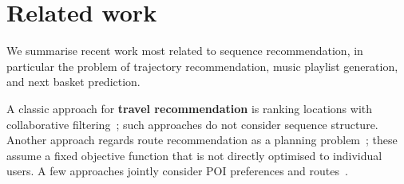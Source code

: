 




\section{Related work}
\label{sec:related}


We summarise recent work most related to sequence recommendation, 
in particular the problem of trajectory recommendation, music playlist generation, 
and next basket prediction.


A classic approach for {\bf travel recommendation} is ranking locations with 
collaborative filtering~\cite{zhang2015location,ijcai13};
such approaches do not consider sequence structure.
Another approach regards route recommendation as a planning problem~\cite{brilhante2013shall,gioniswsdm14,ijcai15};
these assume a fixed objective function that is not directly optimised to individual users. 
A few approaches jointly consider POI preferences and 
routes~\cite{chen2015tripplanner,cikm16paper}.

